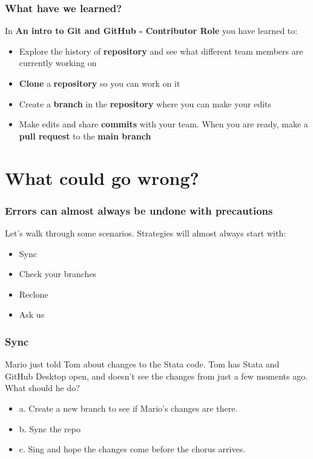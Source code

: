 \documentclass[aspectratio=169]{beamer} %
\begin{document}
\begin{frame}
\frametitle{What have we learned?}

	In \textbf{An intro to Git and GitHub - Contributor Role} you have learned to:

	\begin{itemize}
		\item Explore the history of \textbf{repository} and see what different team members are currently working on
		\item \textbf{Clone} a \textbf{repository} so you can work on it
		\item Create a \textbf{branch} in the \textbf{repository} where you can make your edits
		\item Make edits and share \textbf{commits} with your team. When you are ready, make a \textbf{pull request} to the \textbf{main branch}
	\end{itemize}
\end{frame}


\section{What could go wrong?}


\begin{frame}
\frametitle{Errors can almost always be undone with precautions}

	Let's walk through some scenarios. Strategies will almost always start with:

	\begin{itemize}
		\item Sync
		\item Check your branches
		\item Reclone
		\item Ask us
	\end{itemize}
\end{frame}

\begin{frame}
\frametitle{Sync}

	Mario just told Tom about changes to the Stata code. Tom has Stata and GitHub Desktop open,
	and doesn't see the changes from just a few moments ago. What should he do?
	\begin{itemize}
		\item a. Create a new branch to see if Mario's changes are there.
		\item b. Sync the repo
		\item c. Sing and hope the changes come before the chorus arrives.
	\end{itemize}


\end{frame}
\end{document}
